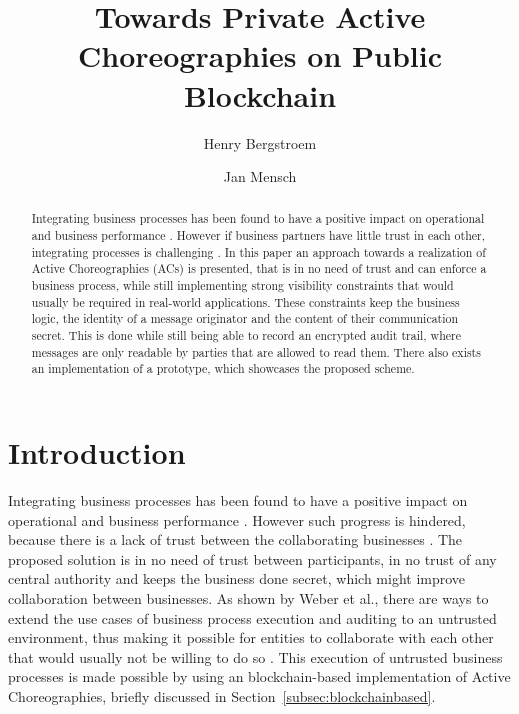 \documentclass[runningheads]{llncs}
\newcommand{\refsec}[1]{Section~\ref{#1}}
\begin{document}
%
\title{Towards Private Active Choreographies on Public Blockchain }
%
%
\author{Henry Bergstroem \and
Jan Mensch}
%
%


%
\maketitle              %
%
\begin{abstract}
    Integrating business processes has been found to have a positive impact on operational and business performance \cite{flynn2010impact,narayanan2011antecedents}. However if business partners have little trust in each other, integrating processes is challenging \cite{panayides2009impact}. In this paper an approach towards a realization of Active Choreographies (ACs) is presented, that is in no need of trust and can enforce a business process, while still implementing strong visibility constraints that would usually be required in real-world applications. These constraints keep the business logic, the identity of a message originator and the content of their communication secret. This is done while still being able to record an encrypted audit trail, where messages are only readable by parties that are allowed to read them. There also exists an implementation of a prototype, which showcases the proposed scheme.
\end{abstract}

\section{Introduction} \label{sec:intro}

Integrating business processes has been found to have a positive impact on operational and business performance \cite{flynn2010impact,narayanan2011antecedents}. However such progress is hindered, because there is a lack of trust between the collaborating businesses \cite{panayides2009impact}. The proposed solution is in no need of trust between participants, in no trust of any central authority and keeps the business done secret, which might improve collaboration between businesses. As shown by Weber et al., there are ways to extend the use cases of business process execution and auditing to an untrusted environment, thus making it possible for entities to collaborate with each other that would usually not be willing to do so \cite{weber2016untrusted}. This execution of untrusted business processes is made possible by using an blockchain-based implementation of Active Choreographies, briefly discussed in \refsec{subsec:blockchainbased}.
\end{document}
